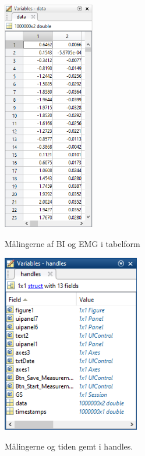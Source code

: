 \begin{figure}[H] 
\centering
{\includegraphics[width=4cm]
{Figure/modultestread6}}
\caption{Målingerne af BI og EMG i tabelform}
\label{fig:modultestread6}
\end{figure}


\begin{figure}[H] 
\centering
{\includegraphics[width=6cm]
{Figure/modultestread7}}
\caption{Målingerne og tiden gemt i handles.}
\label{fig:modultestread7}
\end{figure}



